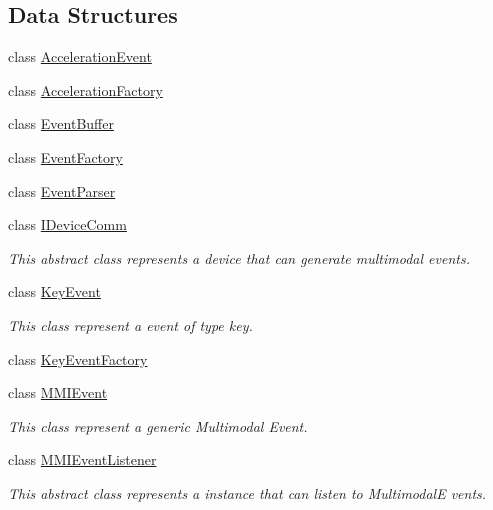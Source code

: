 \subsection*{Data Structures}
\begin{DoxyCompactItemize}
\item 
class \hyperlink{classbr_1_1ufscar_1_1lince_1_1mmi_1_1AccelerationEvent}{AccelerationEvent}
\item 
class \hyperlink{classbr_1_1ufscar_1_1lince_1_1mmi_1_1AccelerationFactory}{AccelerationFactory}
\item 
class \hyperlink{classbr_1_1ufscar_1_1lince_1_1mmi_1_1EventBuffer}{EventBuffer}
\item 
class \hyperlink{classbr_1_1ufscar_1_1lince_1_1mmi_1_1EventFactory}{EventFactory}
\item 
class \hyperlink{classbr_1_1ufscar_1_1lince_1_1mmi_1_1EventParser}{EventParser}
\item 
class \hyperlink{classbr_1_1ufscar_1_1lince_1_1mmi_1_1IDeviceComm}{IDeviceComm}
\begin{DoxyCompactList}\small\item\em This abstract class represents a device that can generate multimodal events. \item\end{DoxyCompactList}\item 
class \hyperlink{classbr_1_1ufscar_1_1lince_1_1mmi_1_1KeyEvent}{KeyEvent}
\begin{DoxyCompactList}\small\item\em This class represent a event of type key. \item\end{DoxyCompactList}\item 
class \hyperlink{classbr_1_1ufscar_1_1lince_1_1mmi_1_1KeyEventFactory}{KeyEventFactory}
\item 
class \hyperlink{classbr_1_1ufscar_1_1lince_1_1mmi_1_1MMIEvent}{MMIEvent}
\begin{DoxyCompactList}\small\item\em This class represent a generic Multimodal Event. \item\end{DoxyCompactList}\item 
class \hyperlink{classbr_1_1ufscar_1_1lince_1_1mmi_1_1MMIEventListener}{MMIEventListener}
\begin{DoxyCompactList}\small\item\em This abstract class represents a instance that can listen to MultimodalE vents. \item\end{DoxyCompactList}\item 

\end{DoxyCompactItemize}
